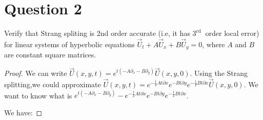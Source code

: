 \section{Question 2}

\begin{question}
    Verify that Strang spliting is 2nd order accurate (i.e, it has $3^{\text {rd }}$ order local error) for linear systems of hyperbolic equations $\vec{U}_t+A \vec{U}_x+B \vec{U}_y=0$, where $A$ and $B$ are constant square matrices.
\end{question}

\begin{answer}
    \begin{proof}
        We can write $\vec{U}(x,y,t) = e^{t(-A\partial_x - B\partial_y)}\vec{U}(x,y,0)$. Using the Strang splitting,we could approximate $\vec{U}(x,y,t) = e^{-\frac{1}{2}At\partial x}e^{-Bt\partial y}e^{-\frac{1}{2}Bt\partial x}\vec{U}(x,y,0)$. We want to know what is $e^{t(-A\partial_x - B\partial_y)} - e^{-\frac{1}{2}At\partial x}e^{-Bt\partial y}e^{-\frac{1}{2}Bt\partial x}$.
        
        We have:
        

\end{proof}
\end{answer}
